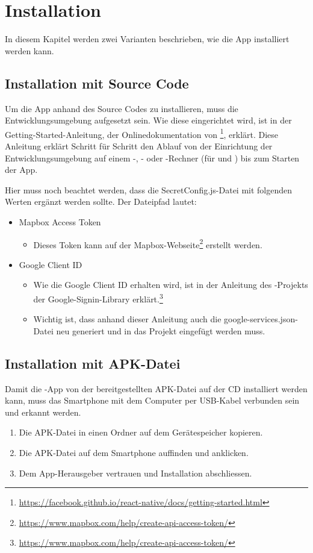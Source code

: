 \chapter{Installation}
\label{pd-installation}

In diesem Kapitel werden zwei Varianten beschrieben, wie die App installiert werden kann.

\section{Installation mit Source Code}
Um die App anhand des Source Codes zu installieren, muss die  Entwicklungsumgebung aufgesetzt sein. 
Wie diese eingerichtet wird, ist in der Getting-Started-Anleitung, der Onlinedokumentation von \footnote{\url{https://facebook.github.io/react-native/docs/getting-started.html}}, erklärt.
Diese Anleitung erklärt Schritt für Schritt den Ablauf von der Einrichtung der Entwicklungsumgebung auf einem -, - oder -Rechner (für  und ) bis zum Starten der App.

Hier muss noch beachtet werden, dass die SecretConfig.js-Datei mit folgenden Werten ergänzt werden sollte.
Der Dateipfad lautet: \newline

\begin{itemize}
	\item Mapbox Access Token
	\begin{itemize}
		\item Dieses Token kann auf der Mapbox-Webseite\footnote{\url{https://www.mapbox.com/help/create-api-access-token/}} erstellt werden.
	\end{itemize}
	
	\item Google Client ID 
	\begin{itemize}
		\item Wie die Google Client ID erhalten wird, ist in der Anleitung des -Projekts der Google-Signin-Library erklärt.\footnote{\url{https://www.mapbox.com/help/create-api-access-token/}}
		\item Wichtig ist, dass anhand dieser Anleitung auch die google-services.json-Datei neu generiert und in das Projekt eingefügt werden muss.
	\end{itemize}
\end{itemize}

\section{Installation mit APK-Datei}
Damit die -App von der bereitgestellten APK-Datei auf der CD installiert werden kann, muss das Smartphone mit dem Computer per USB-Kabel verbunden sein und erkannt werden. 

\begin{enumerate}
	\item Die APK-Datei in einen Ordner auf dem Gerätespeicher kopieren.
	\item Die APK-Datei auf dem Smartphone auffinden und anklicken.
	\item Dem App-Herausgeber vertrauen und Installation abschliessen.
\end{enumerate}

